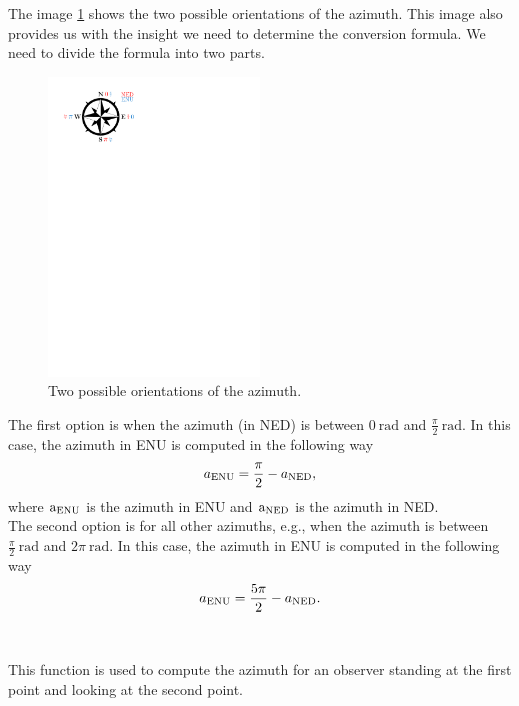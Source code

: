             The image \ref{fig:dir_indi} shows the two possible orientations of the azimuth. This image also provides us with the insight we need to determine the conversion formula. We need to divide the formula into two parts.\\
            \begin{figure}[ht]
                \centering
                \includegraphics[width=0.5\textwidth]{images/direction_indicator.pdf}
                \caption{Two possible orientations of the azimuth.}
                \label{fig:dir_indi}
            \end{figure}
            \noindent The first option is when the azimuth (in NED) is between $0\:\si{\radian}$ and $\frac{\pi}{2}\:\si{\radian}$. In this case, the azimuth in ENU is computed in the following way
            \begin{equation}
                a_{\rm{ENU}} = \frac{\pi}{2} - a_{\rm{NED}},
            \end{equation}
            where $\text{a}_{\rm{ENU}}$ is the azimuth in ENU and $\text{a}_{\rm{NED}}$ is the azimuth in NED.\\
            The second option is for all other azimuths, e.g., when the azimuth is between $\frac{\pi}{2}\:\si{\radian}$ and $2\pi\:\si{\radian}$. In this case, the azimuth in ENU is computed in the following way
            \begin{equation}
                a_{\rm{ENU}} = \frac{5\pi}{2} - a_{\rm{NED}}.
            \end{equation}\\
        \\
            This function is used to compute the azimuth for an observer standing at the first point and looking at the second point.\\
